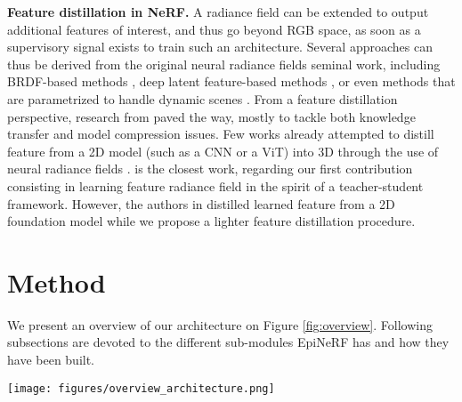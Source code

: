 \noindent\textbf{Feature distillation in NeRF.} A radiance field can be extended to output additional features of interest, and thus go beyond RGB space, as soon as a supervisory signal exists to train such an architecture. Several approaches can thus be derived from the original neural radiance fields seminal work, including BRDF-based methods \cite{Boss_2021_ICCV,verbin2022ref}, deep latent feature-based methods \cite{kobayashi2022decomposing,ye2023featurenerf,chan2023genvs}, or even methods that are parametrized to handle dynamic scenes \cite{pumarola2021d,yan2023nerf}. From a feature distillation perspective, research from \cite{hinton2015distilling} paved the way, mostly to tackle both knowledge transfer and model compression issues. Few works already attempted to distill feature from a 2D model (such as a CNN or a ViT) into 3D through the use of neural radiance fields \cite{kobayashi2022decomposing, tschernezki2022neural}. \cite{ye2023featurenerf} is the closest work, regarding our first contribution consisting in learning feature radiance field in the spirit of a teacher-student framework. However, the authors in \cite{ye2023featurenerf} distilled learned feature from a 2D foundation model \cite{oquab2023dinov2} while we propose a lighter feature distillation procedure. 

\section{Method}

We present an overview of our architecture on Figure \ref{fig:overview}. Following subsections are devoted to the different sub-modules EpiNeRF has and how they have been built.
\begin{figure*}[htb!]
    \center
  \texttt{[image: figures/overview\_architecture.png]}
  \caption{\textbf{Overview of our complete two-stage training EpiNeRF architecture.} (Top left) The first step primarily aims to train our CNN encoder-decoder $\chi$, which can subsequently generates \textit{local} deep features aligned with $I_{s}$. (Top right) Our CNN $\chi$ is then used a teacher model to instruct a residual NeRF student model $\Psi$, termed NeRFeature, to generate such features from any target viewpoint. (Bottom) The second stage training of EpiNeRF is more likely a fine-tuning of both $\chi$ and $\Phi$, with a modified attention epipolar-based volume rendering equation, thanks to the target-aligned feature produced by NeRFeature $\Psi$.}
  \label{fig:overview}
\end{figure*}
